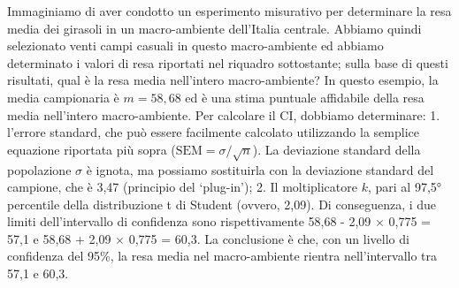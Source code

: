 \documentclass[
  12pt,
]{book}
\begin{document}
Immaginiamo di aver condotto un esperimento misurativo per determinare la resa media dei girasoli in un macro-ambiente dell'Italia centrale. Abbiamo quindi selezionato venti campi casuali in questo macro-ambiente ed abbiamo determinato i valori di resa riportati nel riquadro sottostante; sulla base di questi risultati, qual è la resa media nell'intero macro-ambiente?
In questo esempio, la media campionaria è \(m = 58,68\) ed è una stima puntuale affidabile della resa media nell'intero macro-ambiente. Per calcolare il CI, dobbiamo determinare:
1. l'errore standard, che può essere facilmente calcolato utilizzando la semplice equazione riportata più sopra (\(\textrm{SEM} = {\sigma}/{\sqrt n}\)). La deviazione standard della popolazione \(\sigma\) è ignota, ma possiamo sostituirla con la deviazione standard del campione, che è 3,47 (principio del `plug-in');
2. Il moltiplicatore \(k\), pari al 97,5° percentile della distribuzione t di Student (ovvero, 2,09).
Di conseguenza, i due limiti dell'intervallo di confidenza sono rispettivamente 58,68 - 2,09 \(\times\) 0,775 = 57,1 e 58,68 + 2,09 \(\times\) 0,775 = 60,3. La conclusione è che, con un livello di confidenza del 95\%, la resa media nel macro-ambiente rientra nell'intervallo tra 57,1 e 60,3.
\end{document}
